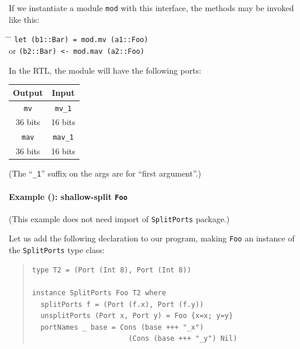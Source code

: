 If we instantiate a module {\tt mod} with this interface, the methods
may be invoked like this:

\begin{tabbing}
\hspace*{4em} \= \hspace*{2em} \= \kill
\hspace*{4em} \>               \> {\tt let (b1::Bar)  = mod.mv  (a1::Foo)} \\
              \>  or           \> {\tt     (b2::Bar) <- mod.mav (a2::Foo)}
\end{tabbing}

In the RTL, the module will have the following ports:

\begin{center}
  \begin{tabular}{|c||c|}
    \hline
     Output &
     Input  \\
    \hline
     {\tt mv}    &
     {\tt mv\_1} \\
     36 bits &
     16 bits \\
    \hline
     {\tt mav}    &
     {\tt mav\_1} \\
     36 bits &
     16 bits \\
    \hline
\end{tabular}

{\footnotesize (The ``{\tt \_1}'' suffix on the args are for ``first argument''.)}
\end{center}


\paragraph{Example (\BH): shallow-split {\tt Foo}}

\label{sec:splitports_examples_BH_Foo_Shallow}

\hspace*{1em}

{\footnotesize (This example does not need import of {\tt SplitPorts} package.)}

Let us add the following declaration to our program, making {\tt Foo}
an instance of the {\tt SplitPorts} type class:

\begin{quote}
\begin{verbatim}
type T2 = (Port (Int 8), Port (Int 8))

instance SplitPorts Foo T2 where
  splitPorts f = (Port (f.x), Port (f.y))
  unsplitPorts (Port x, Port y) = Foo {x=x; y=y}
  portNames _ base = Cons (base +++ "_x")
                       (Cons (base +++ "_y") Nil)
\end{verbatim}
\end{quote}

